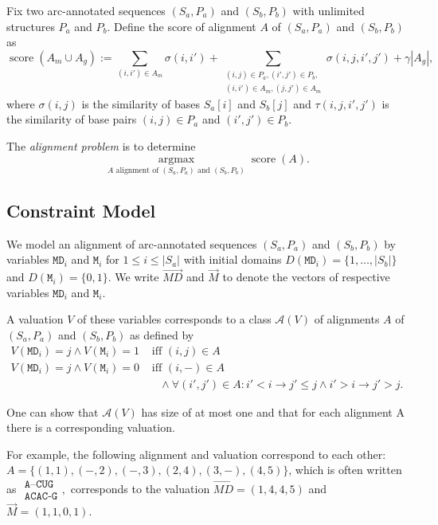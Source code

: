 \documentclass[11pt]{llncs}
\newcommand{\score}{\operatorname{score}}
\newcommand{\argmax}{\operatorname*{arg max}}
\begin{document}
Fix two arc-annotated sequences $(S_a,P_a)$ and $(S_b,P_b)$ with
unlimited structures $P_a$ and $P_b$. Define the score of alignment $A$
of $(S_a,P_a)$ and $(S_b,P_b)$ as
\begin{displaymath}
  \score(A_m\cup A_g) :=
  \sum_{(i,i')\in A_m} \sigma(i,i')
  + \sum_{\substack{(i,j)\in P_a,(i',j')\in P_b,\\(i,i')\in A_m,(j,j')\in A_m}} \sigma(i,j,i',j')
  + \gamma |A_g|,
\end{displaymath}
where $\sigma(i,j)$ is the similarity of bases $S_a[i]$ and $S_b[j]$
and $\tau(i,j,i',j')$ is the similarity of base pairs $(i,j)\in P_a$
and $(i',j')\in P_b$.

The \emph{alignment problem} is to determine 
\begin{displaymath}
  \argmax_{\text{$A$ alignment of $(S_a,P_a)$ and $(S_b,P_b)$}} \score(A).
\end{displaymath}


\newcommand{\var}{\texttt}
\newcommand{\cA}{{\mathcal A}}
\subsection{Constraint Model}

We model an alignment of arc-annotated sequences $(S_a,P_a)$ and
$(S_b,P_b)$ by variables $\var{MD}_i$ and $\var{M}_i$ for $1\leq i\leq
|S_a|$ with initial domains $D(\var{MD}_i) = \{1,\dots,|S_b|\}$ and
$D(\var{M}_i)=\{0,1\}$. We write $\vec{MD}$ and $\vec{M}$ to
denote the vectors of respective variables $\var{MD}_i$ and
$\var{M}_i$.

A valuation $V$ of these variables corresponds to a class $\cA(V)$ of
alignments $A$ of $(S_a,P_a)$ and $(S_b,P_b)$ as defined by
\begin{align*}
  V(\var{MD}_i)=j \land V(\var{M}_i)=1 &\text{ iff } (i,j) \in A  \\
  V(\var{MD}_i)=j \land V(\var{M}_i)=0 &\text{ iff } (i,-) \in A \\&\quad\land \forall (i',j')\in A: i'< i \rightarrow j'\leq j \land i'>i \rightarrow j'>j.
\end{align*}

One can show that $\cA(V)$ has size of at most one and that for each
alignment A there is a corresponding valuation.

For example, the following alignment and valuation correspond to each
other: $A=\{(1,1),(-,2),(-,3),(2,4),(3,-),(4,5)\}$, which is often written as
$\begin{array}{c}
\texttt{A--CUG}\\
\texttt{ACAC-G}
\end{array},$
corresponds to the valuation $\vec{MD}=(1,4,4,5)$ and $\vec{M}=(1,1,0,1)$.
\end{document}
